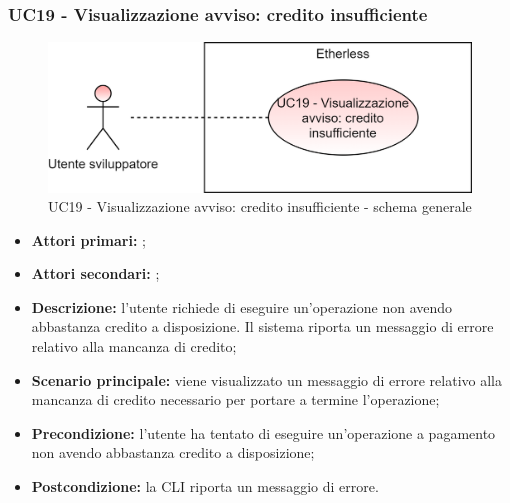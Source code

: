 \subsubsection{UC19 - Visualizzazione avviso: credito insufficiente}
\begin{figure}[H]
	\centering
	\includegraphics[scale=\ucs]{./res/img/UC19G.png}
	\caption {UC19 - Visualizzazione avviso: credito insufficiente - schema generale}
\end{figure}
\begin{itemize}
	\item \textbf{Attori primari:} \ua{};
	\item \textbf{Attori secondari:} \re{};
	\item \textbf{Descrizione:} l’utente richiede di eseguire un’operazione non avendo abbastanza credito a disposizione. Il sistema riporta un messaggio di errore relativo alla mancanza di credito; 
	\item \textbf{Scenario principale:} viene visualizzato un messaggio di errore relativo alla mancanza di credito necessario per portare a termine l’operazione;
	\item \textbf{Precondizione:} l’utente ha tentato di eseguire un’operazione a pagamento non avendo abbastanza credito a disposizione;  
	\item \textbf{Postcondizione:} la CLI riporta un messaggio di errore. 
\end{itemize}
